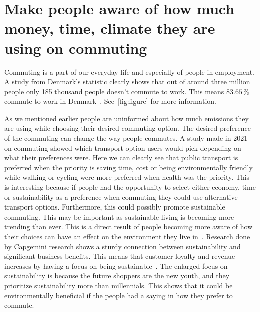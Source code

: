 \section{Make people aware of how much money, time, climate they are using on commuting}
\label{sec:make-people-aware-of-how-much-money-time-climate-they-are-using-on-commuting}

Commuting is a part of our everyday life and especially of people in employment.
A study from Denmark’s statistic clearly shows that out of around three million people only 185 thousand people doesn't
commute to work.
This means \(83.65\,\%\) commute to work in Denmark~\cite{erhvervspendling2021}.
See~\ref{fig:figure} for more information.

As we mentioned earlier people are uninformed about how much emissions they are using while choosing their desired
commuting option.
The desired preference of the commuting can change the way people commutes.
A study made in 2021 on commuting showed which transport option users would pick depending on what their preferences
were.
Here we can clearly see that public transport is preferred when the priority is saving time, cost or being
environmentally friendly while walking or cycling were more preferred when health was the priority.
This is interesting because if people had the opportunity to select either economy, time or sustainability as a
preference when commuting they could use alternative transport options.
Furthermore, this could possibly promote sustainable commuting.
This may be important as sustainable living is becoming more trending than ever.
This is a direct result of people becoming more aware of how their choices can have an effect on the environment they
live in~\cite{spark2023}.
Research done by Capgemini research shows a sturdy connection between sustainability and significant business benefits.
This means that customer loyalty and revenue increases by having a focus on being sustainable~\cite{capgemini2020}.
The enlarged focus on sustainability is because the future shoppers are the new youth, and they prioritize
sustainability more than millennials.
This shows that it could be environmentally beneficial if the people had a saying in how they prefer to commute.


